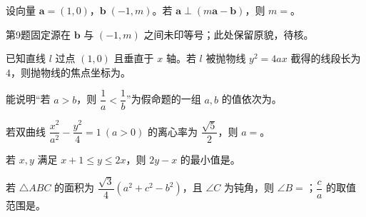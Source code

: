 \begin{question}
设向量 $\boldsymbol a=(1,0)$，$\boldsymbol b\;(-1,m)$。若 $\boldsymbol a\perp(m\boldsymbol a-\boldsymbol b)$，则 $m=$\gkblank{}。

\begin{gktip}
第9题固定源在 $\boldsymbol b$ 与 $(-1,m)$ 之间未印等号；此处保留原貌，待核。
\end{gktip}

\end{question}
\begin{question}
已知直线 $l$ 过点 $(1,0)$ 且垂直于 $x$ 轴。若 $l$ 被抛物线 $y^2=4ax$ 截得的线段长为 $4$，则抛物线的焦点坐标为\gkblank{}。

\end{question}
\begin{question}
能说明“若 $a>b$，则 $\dfrac1a<\dfrac1b$”为假命题的一组 $a,b$ 的值依次为\gkblank{}。

\end{question}
\begin{question}
若双曲线 $\dfrac{x^2}{a^2}-\dfrac{y^2}{4}=1\ (a>0)$ 的离心率为 $\dfrac{\sqrt5}{2}$，则 $a=$\gkblank{}。

\end{question}
\begin{question}
若 $x,y$ 满足 $x+1\le y\le2x$，则 $2y-x$ 的最小值是\gkblank{}。

\end{question}
\begin{question}
若 $\triangle ABC$ 的面积为 $\dfrac{\sqrt3}{4}(a^2+c^2-b^2)$，且 $\angle C$ 为钝角，则 $\angle B=$\gkblank{}；$\dfrac ca$ 的取值范围是\gkblank{}。

\end{question}


